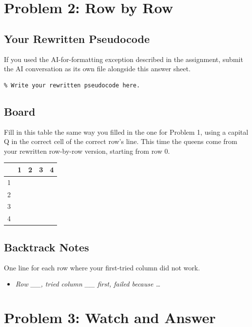 \documentclass[11pt]{article}
\begin{document}
\section{Problem 2: Row by Row}

\subsection{Your Rewritten Pseudocode}
If you used the AI-for-formatting exception described in the assignment,
submit the AI conversation as its own file alongside this answer sheet.

\begin{lstlisting}
% Write your rewritten pseudocode here.
\end{lstlisting}

\subsection{Board}
Fill in this table the same way you filled in the one for Problem 1, using
a capital Q in the correct cell of the correct row's line. This time the
queens come from your rewritten row-by-row version, starting from row 0.

\begin{center}
\renewcommand{\arraystretch}{1.5}
\begin{tabular}{c|c|c|c|c}
 & 1 & 2 & 3 & 4 \\
\hline
1 & & & & \\
\hline
2 & & & & \\
\hline
3 & & & & \\
\hline
4 & & & & \\
\end{tabular}
\end{center}

\subsection{Backtrack Notes}
One line for each row where your first-tried column did not work.

\begin{itemize}[leftmargin=1.4em]
  \item \textit{Row \_\_, tried column \_\_ first, failed because \ldots}
\end{itemize}

\section{Problem 3: Watch and Answer}
\end{document}
